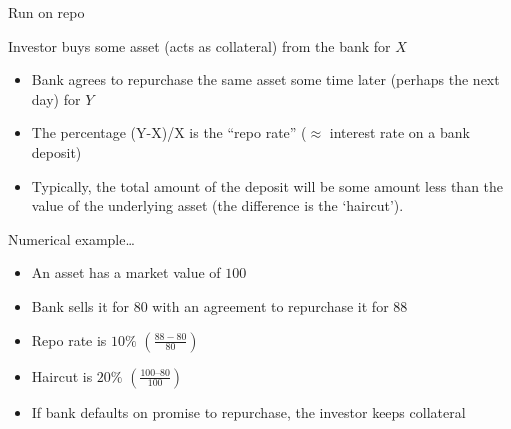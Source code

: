 

\begin{frame}{Run on repo}

Investor buys some asset (acts as collateral) from the bank for $X$
\begin{itemize}
\item	Bank agrees to repurchase the same asset some time later (perhaps the next
day) for $Y$
\item	The percentage (Y-X)/X is the “repo rate” ($\approx$ interest
rate on a bank deposit)
\item	Typically, the total amount of the deposit will be some amount less than the value of the underlying asset (the difference is the `haircut').
\end{itemize}
\vspace{2mm}
Numerical example\ldots
	\begin{itemize}
	\item	An asset has a market value of $100$
	\item	Bank sells it for $80$ with an agreement to repurchase it for $88$
	\item	Repo rate is $10\%$ $\left( \frac{88-80}{80} \right)$
	\item	Haircut is $20\%$ $\left( \frac{100 – 80}{100} \right)$
	\item	If bank defaults on promise to repurchase, the investor keeps collateral
	\end{itemize}

\end{frame}



